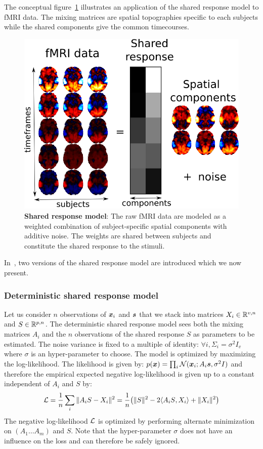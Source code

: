 The conceptual figure~\ref{fig:srm:conceptual_figure} illustrates an 
application of the shared response model to fMRI data. The mixing
matrices are spatial topographies specific to each subjects while the shared
components give the common timecourses.

\begin{figure}
  \centering
  \includegraphics[scale=0.3]{figures/srm/conceptual_figure31.png}
  \caption{\textbf{Shared response model}: The raw fMRI data are modeled as a weighted combination of subject-specific spatial components with additive noise. The weights are shared between subjects and constitute the shared response to the stimuli.}
  \label{fig:srm:conceptual_figure}
\end{figure}

In~\cite{chen2015reduced, anderson2016enabling}, two versions of the shared response model are
introduced which we now present.
\subsubsection{Deterministic shared response model}
\label{sec:deterministicsrm}
Let us consider $n$ observations of $\boldsymbol{x}_i$ and $\boldsymbol{s}$ that we stack into
matrices $X_i \in \mathbb{R}^{v, n}$ and $S \in \mathbb{R}^{p, n}$.
The deterministic shared response model sees both the mixing matrices $A_i$ and
the $n$ observations of the shared response $S$ as parameters to be
estimated. The noise variance is fixed to a multiple of identity: $\forall i,
\Sigma_i=\sigma^2 I_v$ where $\sigma$ is an hyper-parameter to choose.
The model is optimized by maximizing the log-likelihood.
The likelihood is given by: $p(\boldsymbol{x}) = \prod_i \mathcal{N}(\boldsymbol{x}_i; A_i \boldsymbol{s}, \sigma^2 I)$ and
therefore the empirical expected negative log-likelihood is given up to a constant independent of
$A_i$ and $S$ by:
\begin{align}
  \mathcal{L} = \frac1{n} \sum_i \|A_i S - X_i \|^2 = \frac1{n} \big(\| S \|^2 -2 \langle{ A_i S},{ X_i }\rangle + \| X_i \|^2 \big)
  \label{eq:detsrmloss}
\end{align}
The negative log-likelihood $\mathcal{L}$ is optimized by performing alternate minimization on $(A_1 \dots A_m)$
and $S$. Note that the hyper-parameter $\sigma$ does not have an influence on
the loss and can therefore be safely ignored.

